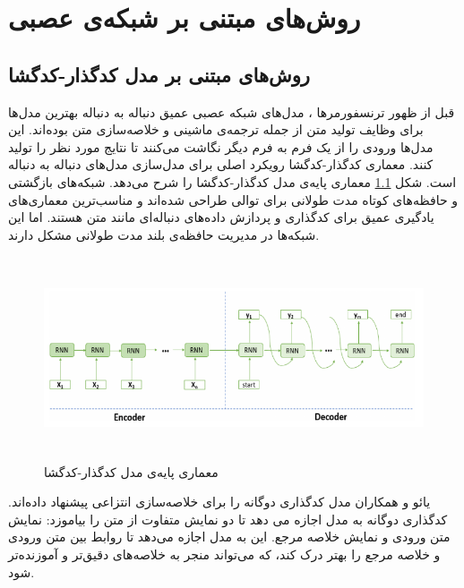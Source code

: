 \chapter{روش‌های مبتنی بر شبکه‌ی عصبی}



%  


\section{روش‌های مبتنی بر مدل کدگذار-کدگشا}
قبل از ظهور ترنسفورمرها ، مدل‌های شبکه عصبی عمیق دنباله به دنباله بهترین مدل‌ها برای وظایف تولید متن از جمله ترجمه‌ی ماشینی و خلاصه‌سازی متن بوده‌اند. این مدل‌ها ورودی را از یک فرم به فرم دیگر نگاشت می‌کنند تا نتایج مورد نظر را تولید کنند. معماری کدگذار-کدگشا رویکرد اصلی برای مدل‌سازی مدل‌های دنباله به دنباله است. شکل \ref{fig:encoder_decoder} معماری پایه‌‌ی مدل  کدگذار-کدگشا را شرح می‌دهد.
شبکه‌های بازگشتی
\cite{elman1990finding}
و حافظه‌های کوتاه مدت طولانی
\cite{hochreiter1997long}
برای توالی طراحی شده‌اند و مناسب‌ترین معماری‌های یادگیری عمیق برای کدگذاری و پردازش داده‌های دنباله‌ای مانند متن هستند. اما این شبکه‌ها در مدیریت حافظه‌ی بلند مدت طولانی
مشکل دارند.
\begin{figure}[!h]
	\begin{center}
		\includegraphics[height=6cm]{encoder_decoder.png}
	\end{center}
	\caption{معماری پایه‌‌ی مدل  کدگذار-کدگشا\cite{ALOMARI}}
	\label{fig:encoder_decoder}
	\medskip
	\small
\end{figure}
یائو
 و همکاران مدل کدگذاری دوگانه را برای خلاصه‌سازی انتزاعی پیشنهاد داده‌اند. 
   کدگذاری دوگانه به مدل اجازه می دهد تا دو نمایش متفاوت از متن را بیاموزد: نمایش متن ورودی و نمایش خلاصه مرجع. این به مدل اجازه می‌دهد تا روابط بین متن ورودی و خلاصه مرجع را بهتر درک کند، که می‌تواند منجر به خلاصه‌های دقیق‌تر و آموزنده‌تر شود.
